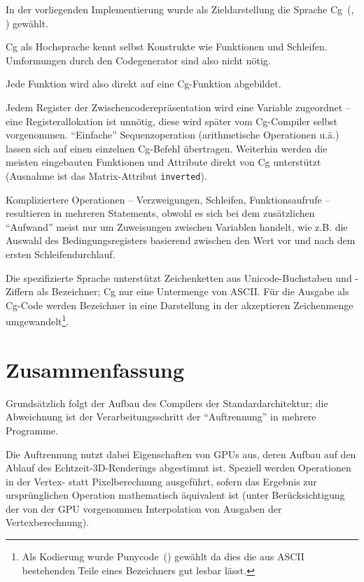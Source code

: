 \documentclass[twoside,a4paper,fleqn,12pt]{book}
\begin{document}
In der vorliegenden Implementierung wurde als Zieldarstellung die Sprache Cg~(\cite{cgpaper}, \cite{cg_home}) gewählt.

Cg als Hochsprache kennt selbst Konstrukte wie Funktionen und Schleifen. Umformungen durch den Codegenerator
sind also nicht nötig.

Jede Funktion wird also direkt auf eine Cg-Funktion abgebildet.

Jedem Register der Zwischencoderepräsentation wird eine Variable zugeordnet -- eine Re\-gis\-ter\-al\-lo\-ka\-tion ist unnötig, diese wird später vom Cg-Compiler selbst vorgenommen.
"`Einfache"' Sequenzoperation (arithmetische Operationen u.ä.) lassen sich auf einen einzelnen Cg-Befehl übertragen. 
Weiterhin werden die meisten eingebauten Funktionen und Attribute direkt von Cg unterstützt (Ausnahme ist das Matrix-Attribut \texttt{inverted}).

Kompliziertere Operationen -- Verzweigungen, Schleifen, Funktionsaufrufe -- resultieren in mehreren Statements, obwohl es sich bei dem
zusätzlichen "`Aufwand"' meist nur um Zuweisungen zwischen Variablen handelt, wie z.B. die Auswahl des Bedingungsregisters basierend zwischen
den Wert vor und nach dem ersten Schleifendurchlauf.

Die spezifizierte Sprache unterstützt Zeichenketten aus Unicode-Buchstaben und -Ziffern als Bezeichner;
Cg nur eine Untermenge von ASCII. Für die Ausgabe als Cg-Code werden Bezeichner in eine Darstellung in der akzeptieren
Zeichenmenge umgewandelt\footnote{Als Kodierung wurde Punycode~(\cite{rfc3492}) gewählt da dies die aus ASCII bestehenden Teile eines Bezeichners
gut lesbar lässt.}.


\section{Zusammenfassung}

Grundsätzlich folgt der Aufbau des Compilers der Standardarchitektur; die Abweichnung ist der Verarbeitungsschritt der "`Auftrennung"' in mehrere
Programme.

Die Auftrennung nutzt dabei Eigenschaften von GPUs aus, deren Aufbau auf den Ablauf des Echtzeit-3D-Renderings abgestimmt ist.
Speziell werden Operationen in der Vertex- statt Pixelberechnung ausgeführt, sofern das Ergebnis zur ursprünglichen Operation mathematisch äquivalent ist
(unter Berücksichtigung der von der GPU vorgenommen Interpolation von Ausgaben der Vertexberechnung).
\end{document}
